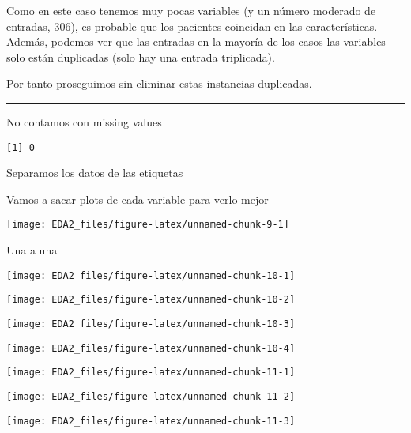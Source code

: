 \documentclass[
]{article}
\begin{document}
Como en este caso tenemos muy pocas variables (y un número moderado de
entradas, 306), es probable que los pacientes coincidan en las
características. Además, podemos ver que las entradas en la mayoría de
los casos las variables solo están duplicadas (solo hay una entrada
triplicada).

Por tanto proseguimos sin eliminar estas instancias duplicadas.

\begin{center}\rule{0.5\linewidth}{0.5pt}\end{center}

No contamos con missing values

\begin{verbatim}
[1] 0
\end{verbatim}

Separamos los datos de las etiquetas

Vamos a sacar plots de cada variable para verlo mejor

\begin{center}\texttt{[image: EDA2\_files/figure-latex/unnamed-chunk-9-1]} \end{center}

Una a una

\begin{center}\texttt{[image: EDA2\_files/figure-latex/unnamed-chunk-10-1]} \end{center}

\begin{center}\texttt{[image: EDA2\_files/figure-latex/unnamed-chunk-10-2]} \end{center}

\begin{center}\texttt{[image: EDA2\_files/figure-latex/unnamed-chunk-10-3]} \end{center}

\begin{center}\texttt{[image: EDA2\_files/figure-latex/unnamed-chunk-10-4]} \end{center}

\begin{center}\texttt{[image: EDA2\_files/figure-latex/unnamed-chunk-11-1]} \end{center}

\begin{center}\texttt{[image: EDA2\_files/figure-latex/unnamed-chunk-11-2]} \end{center}

\begin{center}\texttt{[image: EDA2\_files/figure-latex/unnamed-chunk-11-3]} \end{center}
\end{document}
